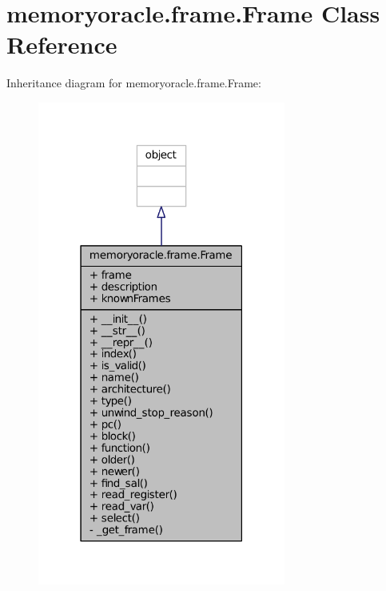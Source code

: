 \hypertarget{classmemoryoracle_1_1frame_1_1Frame}{}\section{memoryoracle.\+frame.\+Frame Class Reference}
\label{classmemoryoracle_1_1frame_1_1Frame}


Inheritance diagram for memoryoracle.\+frame.\+Frame\+:
\nopagebreak
\begin{figure}[H]
\begin{center}
\leavevmode
\includegraphics[width=231pt]{classmemoryoracle_1_1frame_1_1Frame__inherit__graph}
\end{center}
\end{figure}


